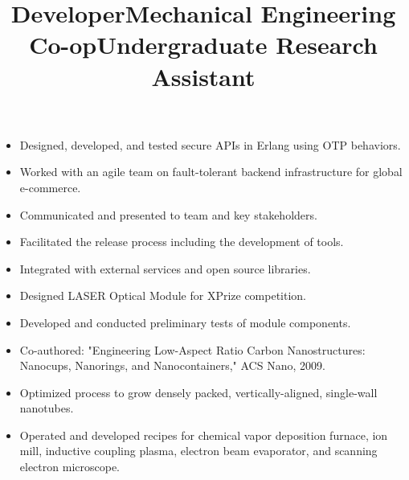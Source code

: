 \documentclass[line]{res}
\begin{document}
\begin{resume}
\begin{position}
\begin{itemize}
\end{itemize}
\end{position}


\title{Developer}
\begin{position}
\noindent
\vspace {-10 pt}
\begin{itemize}
\item Designed, developed, and tested secure APIs in Erlang using OTP behaviors.
\item Worked with an agile team on fault-tolerant backend infrastructure for global e-commerce.
\item Communicated and presented to team and key stakeholders.
\item Facilitated the release process including the development of tools.
\item Integrated with external services and open source libraries.
\end{itemize}
\end{position}

\title{Mechanical Engineering Co-op}
\begin{position}
\noindent
\vspace {-10 pt}
\begin{itemize}
\item Designed LASER Optical Module for XPrize competition.
\item Developed and conducted preliminary tests of module components.
\end{itemize}
\end{position}

\title{Undergraduate Research Assistant}
\begin {position}
\vspace {-10 pt}
\begin{itemize}
\item Co-authored: "Engineering Low-Aspect Ratio Carbon Nanostructures: Nanocups, Nanorings, and Nanocontainers," ACS Nano, 2009.
\item Optimized process to grow densely packed, vertically-aligned, single-wall nanotubes.
\item Operated and developed recipes for chemical vapor deposition furnace, ion mill, inductive coupling plasma, electron beam evaporator, and scanning electron microscope.
\end{itemize}
\end{position}


\end{resume}
\end{document}
